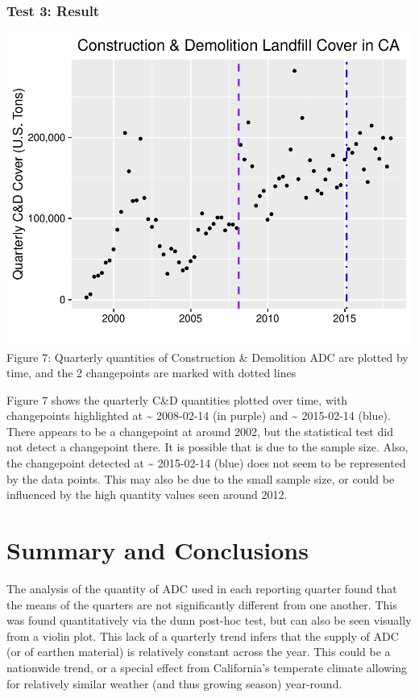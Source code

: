 \documentclass[12pt,]{article}
\begin{document}
\subsubsection{Test 3: Result}\label{test-3-result}

\includegraphics{SKo_Project_Template_files/figure-latex/Test3_2-1.pdf}
Figure 7: Quarterly quantities of Construction \& Demolition ADC are
plotted by time, and the 2 changepoints are marked with dotted lines

Figure 7 shows the quarterly C\&D quantities plotted over time, with
changepoints highlighted at \textasciitilde{} 2008-02-14 (in purple) and
\textasciitilde{} 2015-02-14 (blue). There appears to be a changepoint
at around 2002, but the statistical test did not detect a changepoint
there. It is possible that is due to the sample size. Also, the
changepoint detected at \textasciitilde{} 2015-02-14 (blue) does not
seem to be represented by the data points. This may also be due to the
small sample size, or could be influenced by the high quantity values
seen around 2012.

\newpage

\section{Summary and Conclusions}\label{summary-and-conclusions}

The analysis of the quantity of ADC used in each reporting quarter found
that the means of the quarters are not significantly different from one
another. This was found quantitatively via the dunn post-hoc test, but
can also be seen visually from a violin plot. This lack of a quarterly
trend infers that the supply of ADC (or of earthen material) is
relatively constant across the year. This could be a nationwide trend,
or a special effect from California's temperate climate allowing for
relatively similar weather (and thus growing season) year-round.
\end{document}
